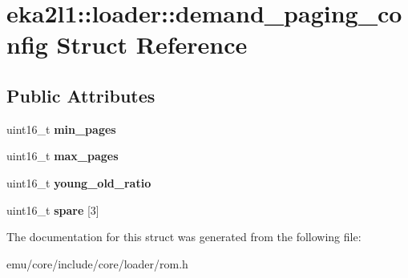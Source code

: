 \hypertarget{structeka2l1_1_1loader_1_1demand__paging__config}{}\section{eka2l1\+:\+:loader\+:\+:demand\+\_\+paging\+\_\+config Struct Reference}
\label{structeka2l1_1_1loader_1_1demand__paging__config}
\subsection*{Public Attributes}
\begin{DoxyCompactItemize}
\item 
\mbox{\label{structeka2l1_1_1loader_1_1demand__paging__config_a637de3b13f94840bab4c90ea682da558}} 
uint16\+\_\+t {\bfseries min\+\_\+pages}
\item 
\mbox{\label{structeka2l1_1_1loader_1_1demand__paging__config_a89a3a489887772d1d45ba38ec5a9191f}} 
uint16\+\_\+t {\bfseries max\+\_\+pages}
\item 
\mbox{\label{structeka2l1_1_1loader_1_1demand__paging__config_a96132283fa0f15052a418914fb375ced}} 
uint16\+\_\+t {\bfseries young\+\_\+old\+\_\+ratio}
\item 
\mbox{\label{structeka2l1_1_1loader_1_1demand__paging__config_acc2145fde07b4e1d0206a689638603a8}} 
uint16\+\_\+t {\bfseries spare} \mbox{[}3\mbox{]}
\end{DoxyCompactItemize}


The documentation for this struct was generated from the following file\+:\begin{DoxyCompactItemize}
\item 
emu/core/include/core/loader/rom.\+h\end{DoxyCompactItemize}
